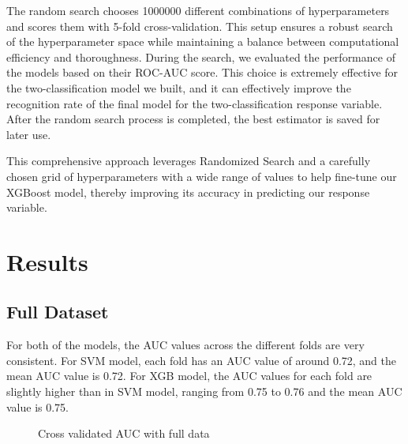 \documentclass{article}
\begin{document}
The random search chooses 1000000 different combinations of hyperparameters and scores them with 5-fold cross-validation. This setup ensures a robust search of the hyperparameter space while maintaining a balance between computational efficiency and thoroughness. During the search, we evaluated the performance of the models based on their ROC-AUC score. This choice is extremely effective for the two-classification model we built, and it can effectively improve the recognition rate of the final model for the two-classification response variable. After the random search process is completed, the best estimator is saved for later use.

This comprehensive approach leverages Randomized Search and a carefully chosen grid of hyperparameters with a wide range of values to help fine-tune our XGBoost model, thereby improving its accuracy in predicting our response variable. \newpage

\section{Results}
\subsection{Full Dataset}

For both of the models, the AUC values across the different folds are very consistent. For SVM model, each fold has an AUC value of around 0.72, and the mean AUC value is 0.72. For XGB model, the AUC values for each fold are slightly higher than in SVM model, ranging from 0.75 to 0.76 and the mean AUC value is 0.75.

\begin{figure}[!ht]
    \centering
    \qquad
    \caption{Cross validated AUC with full data}
\end{figure}
\end{document}
